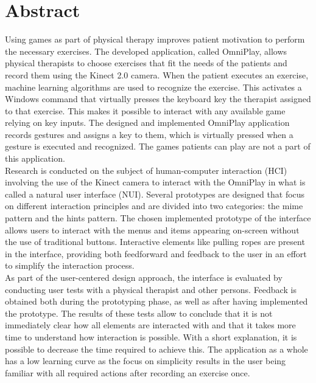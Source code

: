 \chapter*{Abstract}

Using games as part of physical therapy improves patient motivation to perform the necessary exercises. The developed application, called OmniPlay, allows physical therapists to choose exercises that fit the needs of the patients and record them using the Kinect 2.0 camera. When the patient executes an exercise, machine learning algorithms are used to recognize the exercise. This activates a Windows command that virtually presses the keyboard key the therapist assigned to that exercise. This makes it possible to interact with any available game relying on key inputs. The designed and implemented OmniPlay application records gestures and assigns a key to them, which is virtually pressed when a gesture is executed and recognized. The games patients can play are not a part of this application.\\

Research is conducted on the subject of human-computer interaction (HCI) involving the use of the Kinect camera to interact with the OmniPlay in what is called a natural user interface (NUI). Several prototypes are designed that focus on different interaction principles and are divided into two categories: the mime pattern and the hints pattern. The chosen implemented prototype of the interface allows users to interact with the menus and items appearing on-screen without the use of traditional buttons. Interactive elements like pulling ropes are present in the interface, providing both feedforward and feedback to the user in an effort to simplify the interaction process.\\

As part of the user-centered design approach, the interface is evaluated by conducting user tests with a physical therapist and other persons. Feedback is obtained both during the prototyping phase, as well as after having implemented the prototype. The results of these tests allow to conclude that it is not immediately clear how all elements are interacted with and that it takes more time to understand how interaction is possible. With a short explanation, it is possible to decrease the time required to achieve this. The application as a whole has a low learning curve as the focus on simplicity results in the user being familiar with all required actions after recording an exercise once.\\

